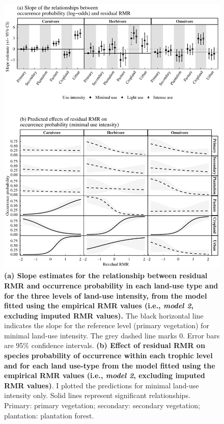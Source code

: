 \newpage
\begin{figure}[h!]
\centering
\includegraphics[scale=0.67]{Supporting/Chapter5/Figures/Figure_predictions_slopes_Complete_data_v2}
\caption[Slope estimates and predictions for the relationship between occurrence probability and residual RMR for the model fitted on empirical RMR values only]{\textbf{(a) Slope estimates for the relationship between residual RMR and occurrence probability in each land-use type and for the three levels of land-use intensity, from the model fitted using the empirical RMR values (i.e., \textit{model 2}, excluding imputed RMR values).} The black horizontal line indicates the slope for the reference level (primary vegetation) for minimal land-use intensity. The grey dashed line marks 0. Error bars are 95\% confidence intervals. \textbf{(b) Effect of residual RMR on species probability of occurrence within each trophic level and for each land use-type from the model fitted using the empirical RMR values (i.e., \textit{model 2}, excluding imputed RMR values)}. I plotted the predictions for minimal land-use intensity only. Solid lines represent significant relationships. Primary: primary vegetation; secondary: secondary vegetation; plantation: plantation forest.}
\label{SI5_figure8}
\end{figure}

\clearpage
